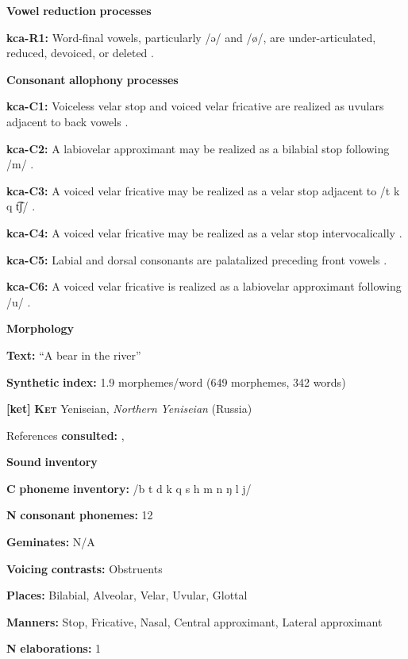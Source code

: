 \textbf{Vowel} \textbf{reduction} \textbf{processes}

\textbf{kca-R1:} Word-final vowels, particularly /ə/ and /ø/, are under-articulated, reduced, devoiced, or deleted \citep[56]{Filchenko2007}.

\textbf{Consonant} \textbf{allophony} \textbf{processes}

\textbf{kca-C1:} Voiceless velar stop and voiced velar fricative are realized as uvulars adjacent to back vowels \citep[41]{Filchenko2007}.

\textbf{kca-C2:} A labiovelar approximant may be realized as a bilabial stop following /m/ \citep[44-45]{Filchenko2007}.

\textbf{kca-C3:} A voiced velar fricative may be realized as a velar stop adjacent to /t k q t͡ʃ/ \citep[45]{Filchenko2007}.

\textbf{kca-C4:} A voiced velar fricative may be realized as a velar stop intervocalically \citep[45]{Filchenko2007}.

\textbf{kca-C5:} Labial and dorsal consonants are palatalized preceding front vowels \citep[37]{Filchenko2007}.

\textbf{kca-C6:} A voiced velar fricative is realized as a labiovelar approximant following /u/ \citep[45-6]{Filchenko2007}.

\textbf{Morphology}

\textbf{Text:} “A bear in the river” \citep[582-588]{Filchenko2007}

\textbf{Synthetic} \textbf{index:} 1.9 morphemes/word (649 morphemes, 342 words)

\textbf{[ket]}   \textbf{\textsc{Ket}}  Yeniseian, \textit{Northern} \textit{Yeniseian} (Russia)

References \textbf{consulted:} \citet{Georg2007}, \citet{Vajda2000}

\textbf{Sound} \textbf{inventory}

\textbf{C} \textbf{phoneme} \textbf{inventory:} /b t d k q s h m n ŋ l j/

\textbf{N} \textbf{consonant} \textbf{phonemes:} 12

\textbf{Geminates:} N/A

\textbf{Voicing} \textbf{contrasts:} Obstruents

\textbf{Places:} Bilabial, Alveolar, Velar, Uvular, Glottal

\textbf{Manners:} Stop, Fricative, Nasal, Central approximant, Lateral approximant

\textbf{N} \textbf{elaborations:} 1

